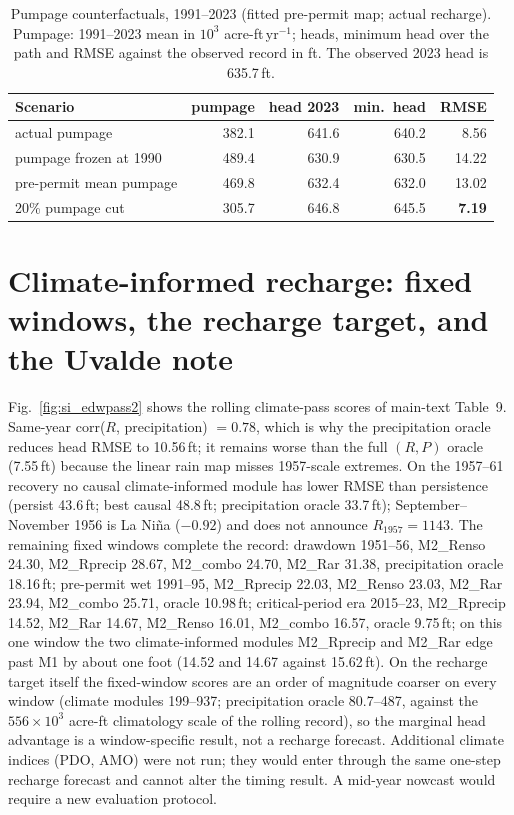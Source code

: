 \documentclass[preprint,11pt,authoryear]{elsarticle}
\theoremstyle{remark}
\begin{document}
\begin{table}[!htb]
\centering\footnotesize\setlength{\tabcolsep}{3.5pt}
\caption{Pumpage counterfactuals, 1991--2023 (fitted pre-permit map; actual recharge). Pumpage: 1991--2023 mean in $10^3$ acre-ft\,yr$^{-1}$; heads, minimum head over the path and RMSE against the observed record in ft. The observed 2023 head is 635.7\,ft.}
\label{tab:si_pumpage}
\begin{tabular}{@{}lrrrr@{}}
\toprule
Scenario & pumpage & head 2023 & min.\ head & RMSE \\
\midrule
actual pumpage & 382.1 & 641.6 & 640.2 & 8.56 \\
pumpage frozen at 1990 & 489.4 & 630.9 & 630.5 & 14.22 \\
pre-permit mean pumpage & 469.8 & 632.4 & 632.0 & 13.02 \\
20\% pumpage cut & 305.7 & 646.8 & 645.5 & \textbf{7.19} \\
\bottomrule
\end{tabular}
\end{table}

\FloatBarrier
\section{Climate-informed recharge: fixed windows, the recharge target, and the Uvalde note}\label{si:edwclimate}

Fig.~\ref{fig:si_edwpass2} shows the rolling climate-pass scores of main-text Table~9. Same-year corr($R$, precipitation) $=0.78$, which is why the precipitation oracle reduces head RMSE to 10.56\,ft; it remains worse than the full $(R,P)$ oracle (7.55\,ft) because the linear rain map misses 1957-scale extremes. On the 1957--61 recovery no causal climate-informed module has lower RMSE than persistence (persist 43.6\,ft; best causal 48.8\,ft; precipitation oracle 33.7\,ft); September--November 1956 is La Ni\~na ($-0.92$) and does not announce $R_{1957}=1143$. The remaining fixed windows complete the record: drawdown 1951--56, M2\_Renso 24.30, M2\_Rprecip 28.67, M2\_combo 24.70, M2\_Rar 31.38, precipitation oracle 18.16\,ft; pre-permit wet 1991--95, M2\_Rprecip 22.03, M2\_Renso 23.03, M2\_Rar 23.94, M2\_combo 25.71, oracle 10.98\,ft; critical-period era 2015--23, M2\_Rprecip 14.52, M2\_Rar 14.67, M2\_Renso 16.01, M2\_combo 16.57, oracle 9.75\,ft; on this one window the two climate-informed modules M2\_Rprecip and M2\_Rar edge past M1 by about one foot (14.52 and 14.67 against 15.62\,ft). On the recharge target itself the fixed-window scores are an order of magnitude coarser on every window (climate modules 199--937; precipitation oracle 80.7--487, against the $556\times10^3$ acre-ft climatology scale of the rolling record), so the marginal head advantage is a window-specific result, not a recharge forecast. Additional climate indices (PDO, AMO) were not run; they would enter through the same one-step recharge forecast and cannot alter the timing result. A mid-year nowcast would require a new evaluation protocol.
\end{document}
